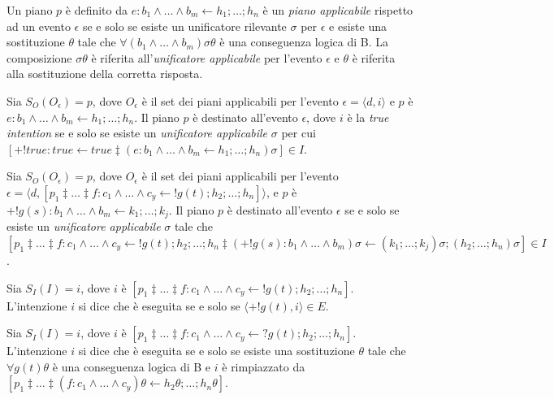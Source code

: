\smallskip
\begin{defn}
Un piano $p$ è definito da $e : b_1 \land \ldots \land b_m \leftarrow h_1; \ldots; h_n$ è un \textit{piano applicabile} rispetto ad un evento $\epsilon$ se e solo se esiste un unificatore rilevante $\sigma$ per $\epsilon$ e esiste una sostituzione $\theta$ tale che $\forall (b_1 \land \ldots \land b_m) \sigma\theta$ è una conseguenza logica di B. La composizione $\sigma\theta$ è riferita all'\textit{unificatore applicabile} per l'evento $\epsilon$ e $\theta$ è riferita alla sostituzione della corretta risposta.
\end{defn}

\smallskip
\begin{defn}
Sia $S_O(O_\epsilon) = p$, dove $O_\epsilon$ è il set dei piani applicabili per l'evento $\epsilon = \langle d, i \rangle$ e $p$ è $e : b_1 \land \ldots \land b_m \leftarrow h_1; \ldots; h_n$. Il piano $p$ è destinato all'evento $\epsilon$, dove $i$ è la \textit{true intention} se e solo se esiste un \textit{unificatore applicabile} $\sigma$ per cui $[+!true : true \leftarrow true \ddagger (e : b_1 \land \ldots \land b_m \leftarrow h_1; \ldots; h_n) \sigma] \in I$.
\end{defn}

\smallskip
\begin{defn}
Sia $S_O(O_\epsilon) = p$, dove $O_\epsilon$ è il set dei piani applicabili per l'evento $\epsilon = \langle d, [p_1 \ddagger \ldots \ddagger f : c_1 \land \ldots \land c_y \leftarrow !g(t); h_2; \ldots; h_n] \rangle$, e $p$ è $+!g(s) : b_1 \land \ldots \land b_m \leftarrow k_1; \ldots; k_j$. Il piano $p$ è destinato all'evento $\epsilon$ se e solo se esiste un \textit{unificatore applicabile} $\sigma$ tale che $[p_1 \ddagger \ldots \ddagger f : c_1 \land \ldots \land c_y \leftarrow !g(t); h_2; \ldots; h_n \ddagger (+!g(s) : b_1 \land \ldots \land b_m) \sigma \leftarrow (k_1; \ldots; k_j) \sigma; (h_2; \ldots; h_n) \sigma] \in I$.
\end{defn}

\smallskip
\begin{defn}
Sia $S_I(I) = i$, dove $i$ è $[p_1 \ddagger \ldots \ddagger f : c_1 \land \ldots \land c_y \leftarrow !g(t);h_2; \ldots; h_n]$. L'intenzione $i$ si dice che è eseguita se e solo se $\langle +!g(t), i \rangle \in E$.
\end{defn}

\smallskip
\begin{defn}
Sia $S_I(I) = i$, dove $i$ è $[p_1 \ddagger \ldots \ddagger f : c_1 \land \ldots \land c_y \leftarrow ?g(t); h_2; \ldots; h_n]$. L'intenzione $i$ si dice che è eseguita se e solo se esiste una sostituzione $\theta$ tale che $\forall g(t) \theta$ è una conseguenza logica di B e $i$ è rimpiazzato da $[p_1 \ddagger \ldots \ddagger (f : c_1 \land \ldots \land c_y) \theta \leftarrow h_2 \theta; \ldots; h_n \theta]$.
\end{defn}

